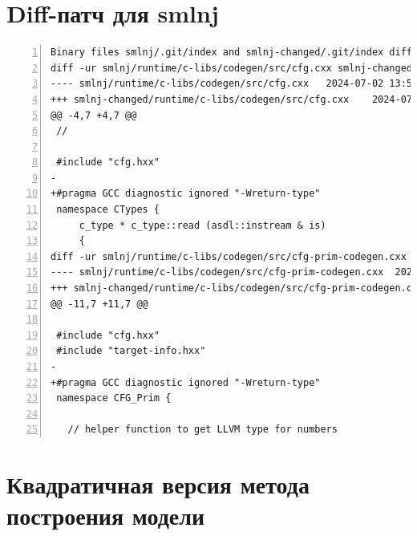 \documentclass[bachelor, och, pract]{SCWorks}
\begin{document}
\section{Diff-патч для smlnj}\label{patch}

\begin{Verbatim}[fontsize=\small,breaklines=true,numbers=left]
Binary files smlnj/.git/index and smlnj-changed/.git/index differ
diff -ur smlnj/runtime/c-libs/codegen/src/cfg.cxx smlnj-changed/runtime/c-libs/codegen/src/cfg.cxx
---- smlnj/runtime/c-libs/codegen/src/cfg.cxx	2024-07-02 13:54:59.549946281 +0400
+++ smlnj-changed/runtime/c-libs/codegen/src/cfg.cxx	2024-07-03 14:19:48.640069436 +0400
@@ -4,7 +4,7 @@
 //
 
 #include "cfg.hxx"
-
+#pragma GCC diagnostic ignored "-Wreturn-type"
 namespace CTypes {
     c_type * c_type::read (asdl::instream & is)
     {
diff -ur smlnj/runtime/c-libs/codegen/src/cfg-prim-codegen.cxx smlnj-changed/runtime/c-libs/codegen/src/cfg-prim-codegen.cxx
---- smlnj/runtime/c-libs/codegen/src/cfg-prim-codegen.cxx	2024-07-02 13:54:59.549946281 +0400
+++ smlnj-changed/runtime/c-libs/codegen/src/cfg-prim-codegen.cxx	2024-07-03 14:19:44.757071614 +0400
@@ -11,7 +11,7 @@
 
 #include "cfg.hxx"
 #include "target-info.hxx"
-
+#pragma GCC diagnostic ignored "-Wreturn-type"
 namespace CFG_Prim {
 
   // helper function to get LLVM type for numbers
\end{Verbatim}

\section{Квадратичная версия метода построения модели}\label{oldbuild}
\end{document}
